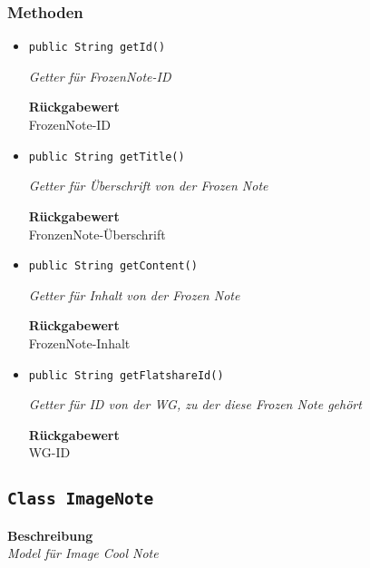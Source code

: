     \subsubsection*{Methoden}
    \begin{itemize}
    	\item{\texttt{public String getId()}}
    	
    	\textit{Getter für FrozenNote-ID}
    	
    	
    	
    	\textbf{Rückgabewert} \\
    	FrozenNote-ID        \item{\texttt{public String getTitle()}}
    	
    	\textit{Getter für Überschrift von der Frozen Note}
    	
    	
    	
    	\textbf{Rückgabewert} \\
    	FronzenNote-Überschrift        \item{\texttt{public String getContent()}}
    	
    	\textit{Getter für Inhalt von der Frozen Note}
    	
    	
    	
    	\textbf{Rückgabewert} \\
    	FrozenNote-Inhalt        \item{\texttt{public String getFlatshareId()}}
    	
    	\textit{Getter für ID von der WG, zu der diese Frozen Note gehört}
    	
    	
    	
    	\textbf{Rückgabewert} \\
    	WG-ID
    \end{itemize}
    \subsection{\texttt{Class ImageNote}}
    \textbf{Beschreibung} \\
    \textit{Model für Image Cool Note}
